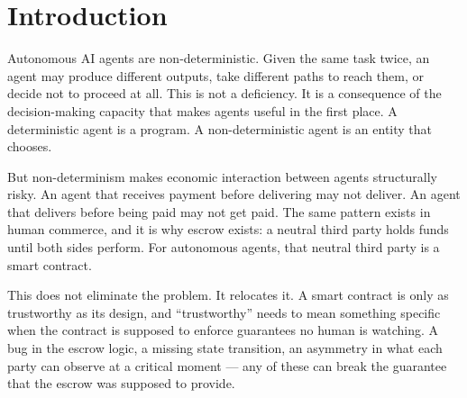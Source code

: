 \documentclass[11pt]{article}
\theoremstyle{plain}
\theoremstyle{definition}
\newcommand{\Hone}{H^{1}}
\begin{document}
\begin{abstract}
Structural completeness is necessary but not sufficient for trustlessness.
The two sheaves answer orthogonal questions and are meant to be read
together.  We also provide open-source tooling: a YAML-driven $\Hone$ linter
with CI integration; 1-complex rank computations cross-validated using exact
rational arithmetic; and a participant visibility model checked against the
live ACTP SDK as of 2026.  To our knowledge this is the first application
of sheaf cohomology to smart contract escrow protocol verification, building
on Felber et al.'s task-sheaf framework but extending it with a participant
information-asymmetry sheaf.
\end{abstract}

\clearpage
\tableofcontents

\clearpage

\section{Introduction}
\label{sec:intro}

Autonomous AI agents are non-deterministic.  Given the same task twice, an
agent may produce different outputs, take different paths to reach them, or
decide not to proceed at all.  This is not a deficiency.  It is a consequence
of the decision-making capacity that makes agents useful in the first place.
A deterministic agent is a program.  A non-deterministic agent is an entity
that chooses.

But non-determinism makes economic interaction between agents structurally
risky.  An agent that receives payment before delivering may not deliver.
An agent that delivers before being paid may not get paid.  The same pattern
exists in human commerce, and it is why escrow exists: a neutral third party
holds funds until both sides perform.  For autonomous agents, that neutral
third party is a smart contract.

This does not eliminate the problem.  It relocates it.  A smart contract is
only as trustworthy as its design, and ``trustworthy'' needs to mean
something specific when the contract is supposed to enforce guarantees no
human is watching.  A bug in the escrow logic, a missing state transition,
an asymmetry in what each party can observe at a critical moment --- any of
these can break the guarantee that the escrow was supposed to provide.
\end{document}
